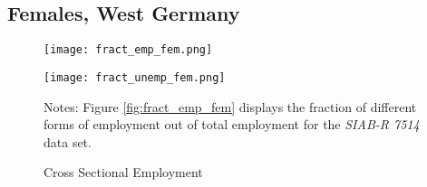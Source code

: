 \documentclass[12pt, a4paper]{article}
\begin{document}







\clearpage
\subsection{Females, West Germany}

\begin{figure}[!h]
\captionsetup{font=large}
\caption{Cross Sectional Employment}
	\begin{minipage}[b]{0.48\textwidth}
		\centering
		\texttt{[image: fract\_emp\_fem.png]}
		\label{fig:fract_emp_fem}
	\end{minipage}
	\begin{minipage}[b]{0.48\textwidth}
		\centering
		\texttt{[image: fract\_unemp\_fem.png]}
		\label{fig:fract_unemp_fem}
	\end{minipage}
\footnotesize{
\justifying Notes: Figure \ref{fig:fract_emp_fem} displays the fraction of different forms of employment out of total employment for the \emph{SIAB-R 7514} data set. \par} 
\end{figure}

\end{document}
